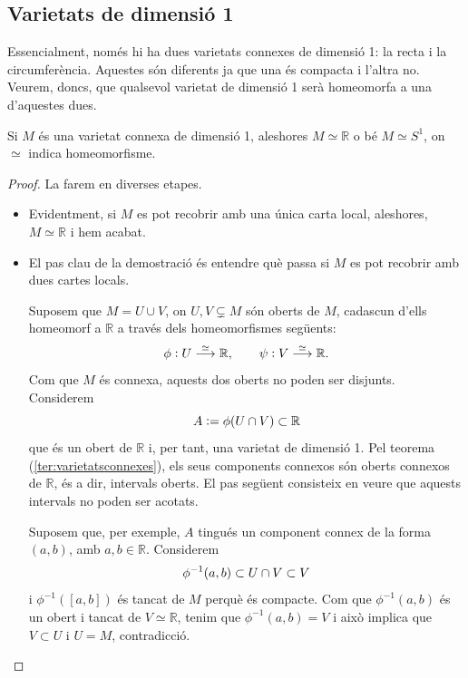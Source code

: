 \documentclass[../main.tex]{subfiles}
\begin{document}
\subsection{Varietats de dimensió 1}

Essencialment, només hi ha dues varietats connexes de dimensió 1: la recta i la circumferència. Aquestes són diferents ja que una és compacta i l'altra no. Veurem, doncs, que qualsevol varietat de dimensió 1 serà homeomorfa a una d'aquestes dues.

\begin{ter}
\label{ter:varietatsdedim1} Si $M$ és una varietat connexa de dimensió 1, aleshores $M\simeq \mathbb{R}$ o bé $M\simeq S^1$, on $\simeq$ indica homeomorfisme.
\end{ter}
\begin{proof}
La farem en diverses etapes.
\begin{itemize}
    \item Evidentment, si $M$ es pot recobrir amb una única carta local, aleshores, $M\simeq \mathbb{R}$ i hem acabat.
    \item El pas clau de la demostració és entendre què passa si $M$ es pot recobrir amb dues cartes locals.
    
    Suposem que $M = U\cup V$, on $U,V\varsubsetneq M$ són oberts de $M$, cadascun d'ells homeomorf a $\mathbb{R}$ a través dels homeomorfismes següents:
    \begin{equation}
        \notag
        \phi:U\overset{\simeq}{\longrightarrow}\mathbb{R},\qquad \psi:V\overset{\simeq}{\longrightarrow} \mathbb{R}.
    \end{equation}
    Com que $M$ és connexa, aquests dos oberts no poden ser disjunts. Considerem
    \begin{equation}
        \notag
        A:=\phi(U\cap V)\subset\mathbb{R}
    \end{equation}
    que és un obert de $\mathbb{R}$ i, per tant, una varietat de dimensió 1. Pel teorema (\ref{ter:varietatsconnexes}), els seus components connexos són oberts connexos de $\mathbb{R}$, és a dir, intervals oberts. El pas següent consisteix en veure que aquests intervals no poden ser acotats.
    
    Suposem que, per exemple, $A$ tingués un component connex de la forma $(a,b)$, amb $a,b\in\mathbb{R}$. Considerem
    \begin{equation}
        \notag
        \phi^{-1}(a,b)\subset U\cap V\subset V
    \end{equation}
    i $\phi^{-1}([a,b])$ és tancat de $M$ perquè és compacte. Com que $\phi^{-1}(a,b)$ és un obert i tancat de $V\simeq \mathbb{R}$, tenim que $\phi^{-1}(a,b)=V$ i això implica que $V\subset U$ i $U=M$, contradicció.
    

\end{itemize}
\end{proof}
\end{document}
